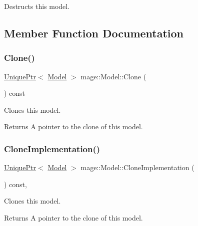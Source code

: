 Destructs this model. 

\subsection{Member Function Documentation}
\hypertarget{classmage_1_1_model_a39d5f0b2b83729a68569072d69113ed7}{}\label{classmage_1_1_model_a39d5f0b2b83729a68569072d69113ed7} 
\subsubsection{\texorpdfstring{Clone()}{Clone()}}
{\footnotesize\ttfamily \hyperlink{namespacemage_a8c307fbcc33bce9b7f2aa4c26c3b95cf}{Unique\+Ptr}$<$ \hyperlink{classmage_1_1_model}{Model} $>$ mage\+::\+Model\+::\+Clone (\begin{DoxyParamCaption}{ }\end{DoxyParamCaption}) const}

Clones this model.

\begin{DoxyReturn}{Returns}
A pointer to the clone of this model. 
\end{DoxyReturn}
\hypertarget{classmage_1_1_model_a4e32ba81c5305dd23dfe760765a5b7d2}{}\label{classmage_1_1_model_a4e32ba81c5305dd23dfe760765a5b7d2} 
\subsubsection{\texorpdfstring{Clone\+Implementation()}{CloneImplementation()}}
{\footnotesize\ttfamily \hyperlink{namespacemage_a8c307fbcc33bce9b7f2aa4c26c3b95cf}{Unique\+Ptr}$<$ \hyperlink{classmage_1_1_model}{Model} $>$ mage\+::\+Model\+::\+Clone\+Implementation (\begin{DoxyParamCaption}{ }\end{DoxyParamCaption}) const\hspace{0.3cm}{\ttfamily [private]}, {\ttfamily [virtual]}}

Clones this model.

\begin{DoxyReturn}{Returns}
A pointer to the clone of this model. 
\end{DoxyReturn}
\hypertarget{classmage_1_1_model_a13badcd5e7bfaf8fbdc447dc211d5ad9}{}\label{classmage_1_1_model_a13badcd5e7bfaf8fbdc447dc211d5ad9} 
